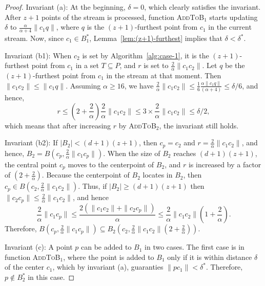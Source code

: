 \documentclass[envcountsame]{cls/cccg15}
\newcommand{\rc}{r}
\newcommand{\cp}{c_p}
\newcommand{\dz}{(d + 1)(z + 1)}
\newcommand{\textproc}{\textsc}
\newcommand{\len}[1]{\|{#1}\|}
\newcommand{\radius}[1]{\frac{2}{\alpha} \len{c_1 #1}}
\newcommand{\lee}{\leqslant}
\newcommand{\gee}{\geqslant}
\renewcommand{\leq}{\lee}
\renewcommand{\ge}{\gee}
\begin{document}
\begin{proof} 
Invariant (a): 
At the beginning, $\delta = 0$, which clearly satisfies the invariant.
After $z+1$ points of the stream is processed, 
function \textproc{AddToB$_1$} starts updating $\delta$
to $\frac{\alpha}{\alpha+4}\len{c_1q}$,
where $q$ is the $(z+1)$-furthest point from $c_1$ in the current stream.
Now, since $c_1 \in B_1^*$, Lemma~\ref{lem:(z+1)-furthest}
implies that $\delta < \delta^*$.

Invariant (b1): 
When $c_2$ is set by Algorithm~\ref{alg:case-1}, 
it is the $(z+1)$-furthest point from $c_1$ in a set $T \subseteq P$,
and $\rc$ is set to $\frac{2}{\alpha}\len{c_1c_2}$.
Let $q$ be the $(z+1)$-furthest point from $c_1$ in the stream at that moment.
Then $\len{c_1c_2} \leq \len{c_1q}$.
Assuming $\alpha \ge 16$, we have 
$\radius{c_2} \leq \frac{1}{6}\frac{\alpha \len{c_1 q}}{(\alpha + 4)} \leq \delta / 6$, 
and hence,  
$$
	r \leq (2 + \frac{2}{\alpha})\radius{c_2} \leq 3 \times \radius{c_2}  \leq \delta /2,
$$
which means that after increasing $r$ by \textproc{AddToB$_2$},
the invariant still holds.

Invariant (b2): If $|B_2| < \dz$, then $c_p = c_2$ and $r = \radius{c_2}$, 
and hence, $B_2 = B(c_p, \radius{c_p})$. 
When the size of $B_2$ reaches $\dz$, 
the central point $\cp$ moves to the centerpoint of $B_2$,
and $\rc$ is increased by a factor of $(2 + \frac{2}{\alpha})$. 
Because the centerpoint of $B_2$ locates in $B_2$, then $c_p \in B(c_2, \radius{c_2})$.
Thus, if $|B_2| \ge \dz$ then $\len{c_2 c_p} \leq \radius{c_2}$, and hence
$$
	\radius{c_p} \leq \frac{2 (\len{c_1 c_2} + \len{c_2 c_p})}{\alpha} \leq \radius{c_2}(1 + \frac{2}{\alpha}).
$$ 
Therefore, $B(c_p, \radius{c_p}) \subseteq B_2(c_2, \radius{c_2}(2 + \frac{2}{\alpha}))$.

Invariant (c): A point $p$ can be added to $B_1$ in two cases. %
The first case is in function \textproc{AddToB$_1$}, 
where the point is added to $B_1$ only if it is within distance $\delta$ of the center $c_1$,  
which by invariant (a), 
guaranties $\len{pc_1} < \delta^*$. Therefore, $p \not \in B_2^*$ in this case.


\end{proof}
\end{document}

